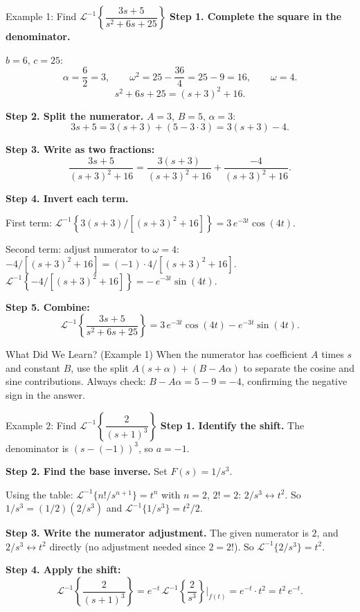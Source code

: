 \documentclass[12pt,a4paper]{article}
\begin{document}
\begin{infobox}{Example 1: Find $\mathcal{L}^{-1}\!\left\{\dfrac{3s+5}{s^2+6s+25}\right\}$}
\textbf{Step 1. Complete the square in the denominator.}

$b = 6$, $c = 25$:
\[
  \alpha = \frac{6}{2} = 3, \qquad
  \omega^2 = 25 - \frac{36}{4} = 25 - 9 = 16, \qquad \omega = 4.
\]
\[
  s^2+6s+25 = (s+3)^2 + 16.
\]

\textbf{Step 2. Split the numerator.} $A = 3$, $B = 5$, $\alpha = 3$:
\[
  3s + 5 = 3(s+3) + (5 - 3\cdot 3) = 3(s+3) - 4.
\]

\textbf{Step 3. Write as two fractions:}
\[
  \frac{3s+5}{(s+3)^2+16}
  = \frac{3(s+3)}{(s+3)^2+16} + \frac{-4}{(s+3)^2+16}.
\]

\textbf{Step 4. Invert each term.}

First term: $\mathcal{L}^{-1}\!\left\{3(s+3)/[(s+3)^2+16]\right\} = 3\,e^{-3t}\cos(4t)$.

Second term: adjust numerator to $\omega = 4$:
$-4/[(s+3)^2+16] = (-1)\cdot 4/[(s+3)^2+16]$.
$\mathcal{L}^{-1}\!\left\{-4/[(s+3)^2+16]\right\} = -\,e^{-3t}\sin(4t)$.

\textbf{Step 5. Combine:}
\[
  \mathcal{L}^{-1}\!\left\{\frac{3s+5}{s^2+6s+25}\right\}
  = 3\,e^{-3t}\cos(4t) - e^{-3t}\sin(4t).
\]
\end{infobox}

\begin{learnbox}{What Did We Learn? (Example 1)}
When the numerator has coefficient $A$ times $s$ and constant $B$, use the split
$A(s+\alpha) + (B - A\alpha)$ to separate the cosine and sine contributions.
Always check: $B - A\alpha = 5 - 9 = -4$, confirming the negative sign in the answer.
\end{learnbox}

\begin{infobox}{Example 2: Find $\mathcal{L}^{-1}\!\left\{\dfrac{2}{(s+1)^3}\right\}$}
\textbf{Step 1. Identify the shift.} The denominator is $(s - (-1))^3$, so $a = -1$.

\textbf{Step 2. Find the base inverse.} Set $F(s) = 1/s^3$.

Using the table: $\mathcal{L}^{-1}\{n!/s^{n+1}\} = t^n$ with $n=2$, $2! = 2$:
$2/s^3 \leftrightarrow t^2$.
So $1/s^3 = (1/2)(2/s^3)$ and $\mathcal{L}^{-1}\{1/s^3\} = t^2/2$.

\textbf{Step 3. Write the numerator adjustment.}
The given numerator is $2$, and $2/s^3 \leftrightarrow t^2$ directly (no adjustment needed
since $2 = 2!$). So $\mathcal{L}^{-1}\{2/s^3\} = t^2$.

\textbf{Step 4. Apply the shift:}
\[
  \mathcal{L}^{-1}\!\left\{\frac{2}{(s+1)^3}\right\}
  = e^{-t}\,\mathcal{L}^{-1}\!\left\{\frac{2}{s^3}\right\}\bigg|_{f(t)}
  = e^{-t}\cdot t^2
  = t^2\,e^{-t}.
\]
\end{infobox}
\end{document}
